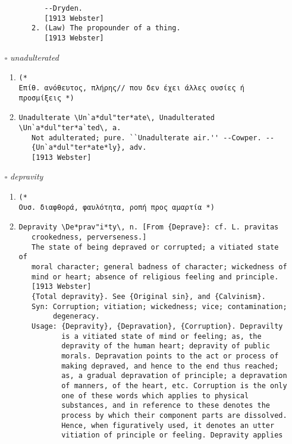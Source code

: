 \documentclass{article}
\begin{document}
\begin{itemize}
\begin{enumerate}
{\begin{lstlisting}
      --Dryden.
      [1913 Webster]
   2. (Law) The propounder of a thing.
      [1913 Webster]
\end{lstlisting}}
\end{enumerate}
\item[$\square$] \emph{ unadulterated }
\begin{enumerate}
\item{
\begin{lstlisting}
(* 
Επίθ. ανόθευτος, πλήρης// που δεν έχει άλλες ουσίες ή προσμίξεις *)
\end{lstlisting}}
\item{
\begin{lstlisting}
Unadulterate \Un`a*dul"ter*ate\, Unadulterated
\Un`a*dul"ter*a`ted\, a.
   Not adulterated; pure. ``Unadulterate air.'' --Cowper. --
   {Un`a*dul"ter*ate*ly}, adv.
   [1913 Webster]
\end{lstlisting}}
\end{enumerate}
\item[$\square$] \emph{ depravity }
\begin{enumerate}
\item{
\begin{lstlisting}
(* 
Ουσ. διαφθορά, φαυλότητα, ροπή προς αμαρτία *)
\end{lstlisting}}
\item{
\begin{lstlisting}
Depravity \De*prav"i*ty\, n. [From {Deprave}: cf. L. pravitas
   crookedness, perverseness.]
   The state of being depraved or corrupted; a vitiated state of
   moral character; general badness of character; wickedness of
   mind or heart; absence of religious feeling and principle.
   [1913 Webster]
   {Total depravity}. See {Original sin}, and {Calvinism}.
   Syn: Corruption; vitiation; wickedness; vice; contamination;
        degeneracy.
   Usage: {Depravity}, {Depravation}, {Corruption}. Depravilty
          is a vitiated state of mind or feeling; as, the
          depravity of the human heart; depravity of public
          morals. Depravation points to the act or process of
          making depraved, and hence to the end thus reached;
          as, a gradual depravation of principle; a depravation
          of manners, of the heart, etc. Corruption is the only
          one of these words which applies to physical
          substances, and in reference to these denotes the
          process by which their component parts are dissolved.
          Hence, when figuratively used, it denotes an utter
          vitiation of principle or feeling. Depravity applies

\end{lstlisting}}
\end{enumerate}
\end{itemize}
\end{document}
